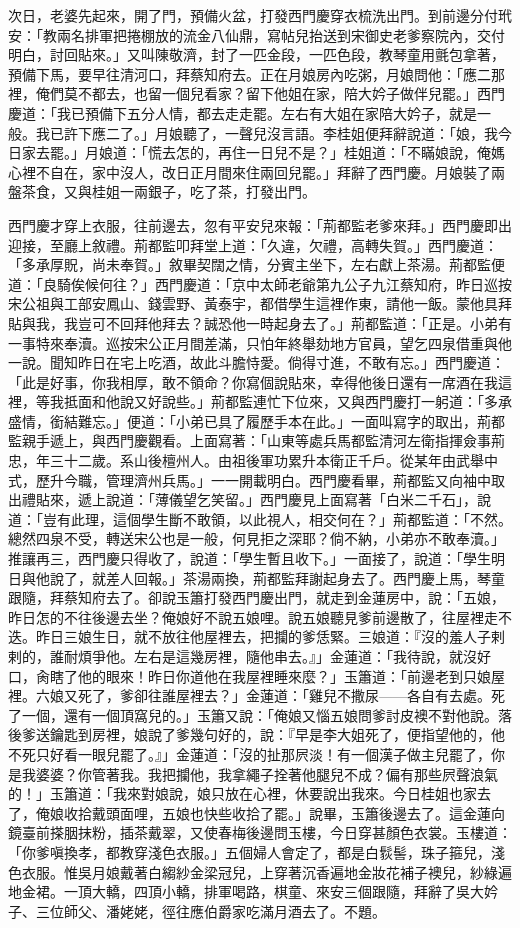 次日，老婆先起來，開了門，預備火盆，打發西門慶穿衣梳洗出門。到前邊分付玳安：「教兩名排軍把捲棚放的流金八仙鼎，寫帖兒抬送到宋御史老爹察院內，交付明白，討回貼來。」又叫陳敬濟，封了一匹金段，一匹色段，教琴童用氈包拿著，預備下馬，要早往清河口，拜蔡知府去。正在月娘房內吃粥，月娘問他：「應二那裡，俺們莫不都去，也留一個兒看家？留下他姐在家，陪大妗子做伴兒罷。」西門慶道：「我已預備下五分人情，都去走走罷。左右有大姐在家陪大妗子，就是一般。我已許下應二了。」月娘聽了，一聲兒沒言語。李桂姐便拜辭說道：「娘，我今日家去罷。」月娘道：「慌去怎的，再住一日兒不是？」桂姐道：「不瞞娘說，俺媽心裡不自在，家中沒人，改日正月間來住兩回兒罷。」拜辭了西門慶。月娘裝了兩盤茶食，又與桂姐一兩銀子，吃了茶，打發出門。

西門慶才穿上衣服，往前邊去，忽有平安兒來報：「荊都監老爹來拜。」西門慶即出迎接，至廳上敘禮。荊都監叩拜堂上道：「久違，欠禮，高轉失賀。」西門慶道：「多承厚貺，尚未奉賀。」敘畢契闊之情，分賓主坐下，左右獻上茶湯。荊都監便道：「良騎俟候何往？」西門慶道：「京中太師老爺第九公子九江蔡知府，昨日巡按宋公祖與工部安鳳山、錢雲野、黃泰宇，都借學生這裡作東，請他一飯。蒙他具拜貼與我，我豈可不回拜他拜去？誠恐他一時起身去了。」荊都監道：「正是。小弟有一事特來奉瀆。巡按宋公正月間差滿，只怕年終舉劾地方官員，望乞四泉借重與他一說。聞知昨日在宅上吃酒，故此斗膽恃愛。倘得寸進，不敢有忘。」西門慶道：「此是好事，你我相厚，敢不領命？你寫個說貼來，幸得他後日還有一席酒在我這裡，等我抵面和他說又好說些。」荊都監連忙下位來，又與西門慶打一躬道：「多承盛情，銜結難忘。」便道：「小弟已具了履歷手本在此。」一面叫寫字的取出，荊都監親手遞上，與西門慶觀看。上面寫著：「山東等處兵馬都監清河左衛指揮僉事荊忠，年三十二歲。系山後檀州人。由祖後軍功累升本衛正千戶。從某年由武舉中式，歷升今職，管理濟州兵馬。」一一開載明白。西門慶看畢，荊都監又向袖中取出禮貼來，遞上說道：「薄儀望乞笑留。」西門慶見上面寫著「白米二千石」，說道：「豈有此理，這個學生斷不敢領，以此視人，相交何在？」荊都監道：「不然。總然四泉不受，轉送宋公也是一般，何見拒之深耶？倘不納，小弟亦不敢奉瀆。」推讓再三，西門慶只得收了，說道：「學生暫且收下。」一面接了，說道：「學生明日與他說了，就差人回報。」茶湯兩換，荊都監拜謝起身去了。西門慶上馬，琴童跟隨，拜蔡知府去了。卻說玉簫打發西門慶出門，就走到金蓮房中，說：「五娘，昨日怎的不往後邊去坐？俺娘好不說五娘哩。說五娘聽見爹前邊散了，往屋裡走不迭。昨日三娘生日，就不放往他屋裡去，把攔的爹恁緊。三娘道：『沒的羞人子剌剌的，誰耐煩爭他。左右是這幾房裡，隨他串去。』」金蓮道：「我待說，就沒好口，肏瞎了他的眼來！昨日你道他在我屋裡睡來麼？」玉簫道：「前邊老到只娘屋裡。六娘又死了，爹卻往誰屋裡去？」金蓮道：「雞兒不撒尿——各自有去處。死了一個，還有一個頂窩兒的。」玉簫又說：「俺娘又惱五娘問爹討皮襖不對他說。落後爹送鑰匙到房裡，娘說了爹幾句好的，說：『早是李大姐死了，便指望他的，他不死只好看一眼兒罷了。』」金蓮道：「沒的扯那屄淡！有一個漢子做主兒罷了，你是我婆婆？你管著我。我把攔他，我拿繩子拴著他腿兒不成？偏有那些屄聲浪氣的！」玉簫道：「我來對娘說，娘只放在心裡，休要說出我來。今日桂姐也家去了，俺娘收拾戴頭面哩，五娘也快些收拾了罷。」說畢，玉簫後邊去了。這金蓮向鏡臺前搽胭抹粉，插茶戴翠，又使春梅後邊問玉樓，今日穿甚顏色衣裳。玉樓道：「你爹嗔換孝，都教穿淺色衣服。」五個婦人會定了，都是白䯼髻，珠子箍兒，淺色衣服。惟吳月娘戴著白縐紗金梁冠兒，上穿著沉香遍地金妝花補子襖兒，紗綠遍地金裙。一頂大轎，四頂小轎，排軍喝路，棋童、來安三個跟隨，拜辭了吳大妗子、三位師父、潘姥姥，徑往應伯爵家吃滿月酒去了。不題。

